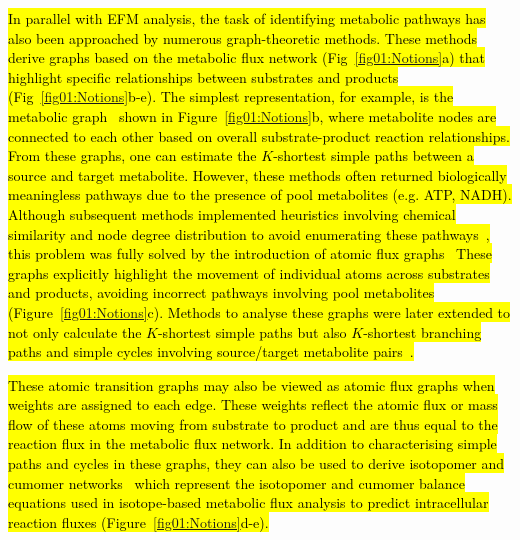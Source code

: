 \documentclass[12pt]{article}
\begin{document}
\hl{
In parallel with EFM analysis, the task of identifying metabolic pathways
has also been approached by numerous graph-theoretic methods. These
methods derive graphs based on the metabolic flux network
(Fig~{\ref{fig01:Notions}}a) that highlight specific relationships between
substrates and products (Fig~{\ref{fig01:Notions}}b-e). The simplest
representation, for example, is the metabolic
graph~\citep{AritaMasanori2000Mrus,WagnerAndreas2001Tswi} shown in
Figure~{\ref{fig01:Notions}}b, where metabolite nodes are connected to each
other based on overall substrate-product reaction relationships. From
these graphs, one can estimate the $K$-shortest simple paths between
a source and target metabolite. However, these methods often returned
biologically meaningless pathways due to the presence of pool metabolites
(e.g. ATP, NADH). Although subsequent methods implemented heuristics
involving chemical similarity and node degree distribution to avoid
enumerating these
pathways~\citep{McShanD2003PathMiner,RahmanSA2004Mpaw,CroesDidier2006IMPi},
this problem was fully solved by the introduction of atomic flux
graphs~\citep{AritaMasanori2003ISAT} These graphs explicitly highlight the
movement of individual atoms across substrates and products, avoiding
incorrect pathways involving pool metabolites
(Figure~{\ref{fig01:Notions}}c). Methods to analyse these graphs were later
extended to not only calculate the $K$-shortest simple paths but also
$K$-shortest branching paths and simple cycles involving source/target
metabolite
pairs~\citep{BlumTorsten2008Mfsf,PitkanenEsa2009Ibpi,HeathAllisonP.2010Fmpu,HeathAllisonP.2011AAfE,PeyJon2011Pfma,LatendresseMario2014Omrs,KimSarahM.2020Itoa}.
}

\hl{
These atomic transition graphs may also be viewed as atomic flux graphs
when weights are assigned to each edge. These weights reflect the atomic
flux or mass flow of these atoms moving from substrate to product and are
thus equal to the reaction flux in the metabolic flux network. In addition
to characterising simple paths and cycles in these graphs, they can also
be used to derive isotopomer and cumomer
networks~\citep{WiechertWolfgang1999Brsi,WeitzelMichael2007Ttom} which
represent the isotopomer and cumomer balance equations used in
isotope-based metabolic flux analysis to predict intracellular reaction
fluxes (Figure~{\ref{fig01:Notions}}d-e).
}
\end{document}
